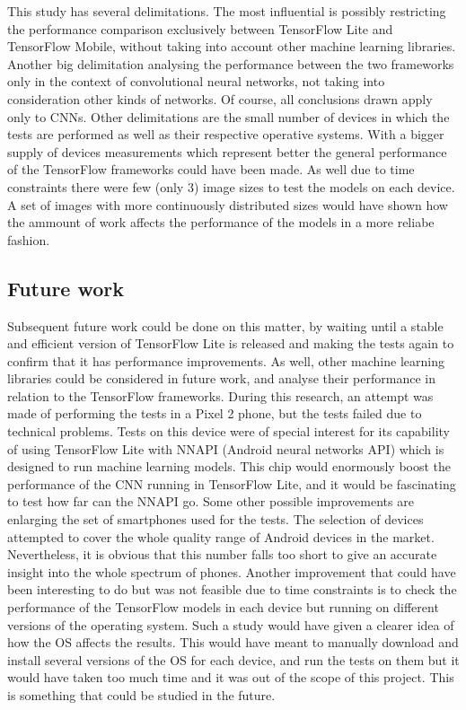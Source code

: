 This study has several delimitations. The most influential is possibly restricting the performance comparison exclusively between TensorFlow Lite and TensorFlow Mobile, without taking into account other machine learning libraries. Another big delimitation analysing the performance between the two frameworks only in the context of convolutional neural networks, not taking into consideration other kinds of networks. Of course, all conclusions drawn apply only to CNNs. Other delimitations are the small number of devices in which the tests are performed as well as their respective operative systems. With a bigger supply of devices measurements which represent better the general performance of the TensorFlow frameworks could have been made. As well due to time constraints there were few (only 3) image sizes to test the models on each device. A set of images with more continuously distributed sizes would have shown how the ammount of work affects the performance of the models in a more reliabe fashion. \\

\subsection{Future work}
Subsequent future work could be done on this matter, by waiting until a stable and efficient version of TensorFlow Lite is released and making the tests again to confirm that it has performance improvements. As well, other machine learning libraries could be considered in future work, and analyse their performance in relation to the TensorFlow frameworks. During this research, an attempt was made of performing the tests in a Pixel 2 phone, but the tests failed due to technical problems. Tests on this device were of special interest for its capability of using TensorFlow Lite with NNAPI (Android neural networks API) which is designed to run machine learning models. This chip would enormously boost the performance of the CNN running in TensorFlow Lite, and it would be fascinating to test how far can the NNAPI go. Some other possible improvements are enlarging the set of smartphones used for the tests. The selection of devices attempted to cover the whole quality range of Android devices in the market. Nevertheless, it is obvious that this number falls too short to give an accurate insight into the whole spectrum of phones. Another improvement that could have been interesting to do but was not feasible due to time constraints is to check the performance of the TensorFlow models in each device but running on different versions of the operating system. Such a study would have given a clearer idea of how the OS affects the results. This would have meant to manually download and install several versions of the OS for each device, and run the tests on them but it would have taken too much time and it was out of the scope of this project. This is something that could be studied in the future.
